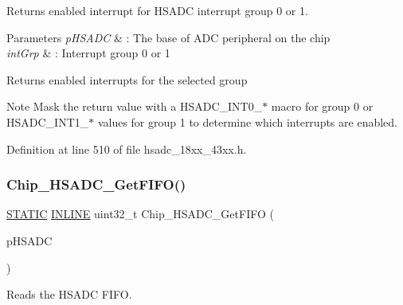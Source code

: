 Returns enabled interrupt for H\+S\+A\+DC interrupt group 0 or 1. 


\begin{DoxyParams}{Parameters}
{\em p\+H\+S\+A\+DC} & \+: The base of A\+DC peripheral on the chip \\
\hline
{\em int\+Grp} & \+: Interrupt group 0 or 1 \\
\hline
\end{DoxyParams}
\begin{DoxyReturn}{Returns}
enabled interrupts for the selected group 
\end{DoxyReturn}
\begin{DoxyNote}{Note}
Mask the return value with a H\+S\+A\+D\+C\+\_\+\+I\+N\+T0\+\_\+$\ast$ macro for group 0 or H\+S\+A\+D\+C\+\_\+\+I\+N\+T1\+\_\+$\ast$ values for group 1 to determine which interrupts are enabled. 
\end{DoxyNote}


Definition at line 510 of file hsadc\+\_\+18xx\+\_\+43xx.\+h.

\mbox{\label{group___h_s_a_d_c__18_x_x__43_x_x_ga0c89dc698fbb5f5c70b471bad3c15ae4}} 
\subsubsection{\texorpdfstring{Chip\+\_\+\+H\+S\+A\+D\+C\+\_\+\+Get\+F\+I\+F\+O()}{Chip\_HSADC\_GetFIFO()}}
{\footnotesize\ttfamily \hyperlink{group___l_p_c___types___public___macros_ga10b2d890d871e1489bb02b7e70d9bdfb}{S\+T\+A\+T\+IC} \hyperlink{spifi__18xx__43xx_8h_a2eb6f9e0395b47b8d5e3eeae4fe0c116}{I\+N\+L\+I\+NE} uint32\+\_\+t Chip\+\_\+\+H\+S\+A\+D\+C\+\_\+\+Get\+F\+I\+FO (\begin{DoxyParamCaption}\item[{\hyperlink{struct_l_p_c___h_s_a_d_c___t}{L\+P\+C\+\_\+\+H\+S\+A\+D\+C\+\_\+T} $\ast$}]{p\+H\+S\+A\+DC }\end{DoxyParamCaption})}



Reads the H\+S\+A\+DC F\+I\+FO. 



